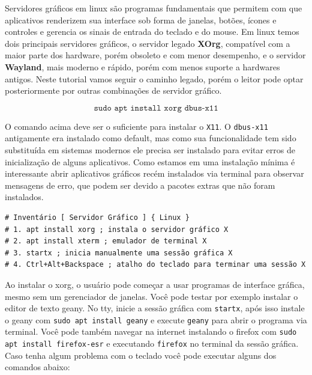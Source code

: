 \documentclass[12pt,a4paper]{article}
\begin{document}
\vspace{\baselineskip}

Servidores gráficos em linux são programas fundamentais que permitem com que aplicativos renderizem sua interface sob forma de janelas, botões, ícones e controles e gerencia os sinais de entrada do teclado e do mouse. Em linux temos dois principais servidores gráficos, o servidor legado \textbf{XOrg}, compatível com a maior parte dos hardware, porém obsoleto e com menor desempenho, e o servidor \textbf{Wayland}, mais moderno e rápido, porém com menos suporte a hardwares antigos. Neste tutorial vamos seguir o caminho legado, porém o leitor pode optar posteriormente por outras combinações de servidor gráfico.

$$ \texttt{sudo apt install xorg dbus-x11} $$

O comando acima deve ser o suficiente para instalar o \texttt{X11}. O \texttt{dbus-x11} antigamente era instalado como default, mas como sua funcionalidade tem sido substituída em sistemas modernos ele precisa ser instalado para evitar erros de inicialização de alguns aplicativos. Como estamos em uma instalação mínima é interessante abrir aplicativos gráficos recém instalados via terminal para observar mensagens de erro, que podem ser devido a pacotes extras que não foram instalados. \\

\begin{lstlisting}
# Inventário [ Servidor Gráfico ] { Linux }
# 1. apt install xorg ; instala o servidor gráfico X
# 2. apt install xterm ; emulador de terminal X
# 3. startx ; inicia manualmente uma sessão gráfica X
# 4. Ctrl+Alt+Backspace ; atalho do teclado para terminar uma sessão X
\end{lstlisting}

\vspace{\baselineskip}

Ao instalar o xorg, o usuário pode começar a usar programas de interface gráfica, mesmo sem um gerenciador de janelas. Você pode testar por exemplo instalar o editor de texto geany. No tty, inicie a sessão gráfica com \texttt{startx}, após isso instale o geany com \texttt{sudo apt install geany} e execute \texttt{geany} para abrir o programa via terminal. Você pode também navegar na internet instalando o firefox com \texttt{sudo apt install firefox-esr} e executando \texttt{firefox} no terminal da sessão gráfica.\\

Caso tenha algum problema com o teclado você pode executar alguns dos comandos abaixo: \\
\end{document}
